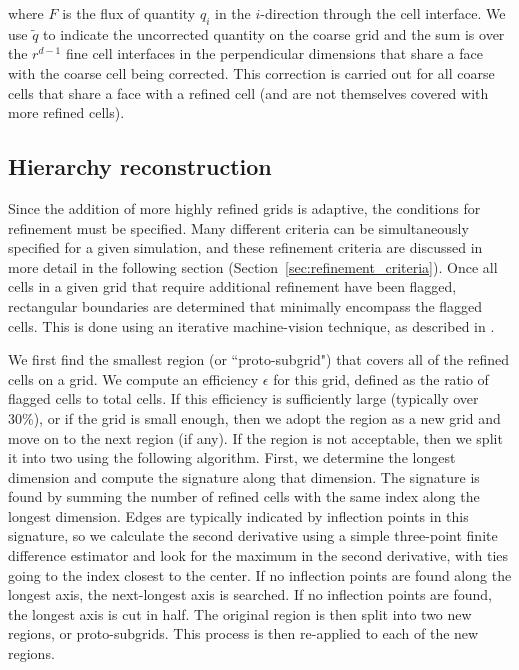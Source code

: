 where $F$ is the flux of quantity $q_i$ in the $i$-direction through
the cell interface.   We use $\tilde{q}$ to indicate the uncorrected
quantity on the coarse grid and the sum is over the $r^{d-1}$ fine
cell interfaces in the perpendicular dimensions that share a face with
the coarse cell being corrected.  This correction is carried out for
all coarse cells that share a face with a refined cell (and are not
themselves covered with more refined cells).

\subsection{Hierarchy reconstruction}
\label{sec:hierarchy_reconstruction}

Since the addition of more highly refined grids is adaptive, the
conditions for refinement must be specified. Many different criteria
can be simultaneously specified for a given simulation, and these
refinement criteria are discussed in more detail in the following
section (Section~\ref{sec:refinement_criteria}).   Once all cells in a
given grid that require additional refinement have been flagged,
rectangular boundaries are determined that minimally encompass the
flagged cells.  This is done using an iterative machine-vision
technique, as described in \cite{Berger91}.

We first find the smallest region (or ``proto-subgrid") that covers
all of the refined cells on a grid.  We compute an efficiency
$\epsilon$ for this grid, defined as the ratio of flagged cells to
total cells.  If this efficiency is sufficiently large (typically over
30\%), or if the grid is small enough, then we adopt the region as a
new grid and move on to the next region (if any).  If the region is
not acceptable, then we split it into two using the following
algorithm.  First, we determine the longest dimension and compute the
signature along that dimension.  The signature is found by summing the
number of refined cells with the same index along the longest
dimension.  Edges are typically indicated by inflection points in this
signature, so we calculate the second derivative using a simple
three-point finite difference estimator and look for the maximum in
the second derivative, with ties going to the index closest to the
center.  If no inflection points are found along the longest axis, the
next-longest axis is searched.  If no inflection points are found, the
longest axis is cut in half.  The original region is then split into
two new regions, or proto-subgrids.  This process is then re-applied
to each of the new regions.


